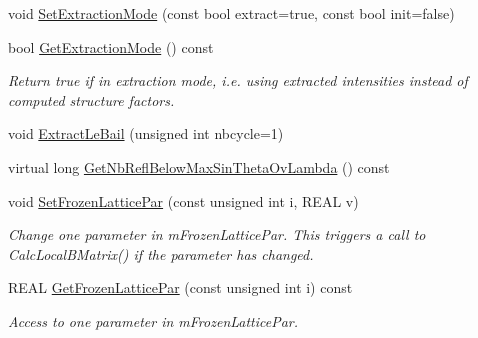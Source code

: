 \begin{DoxyCompactItemize}
\item 
void \mbox{\hyperlink{class_obj_cryst_1_1_powder_pattern_diffraction_a02f1293bc57c472a85741a328521d95f}{Set\+Extraction\+Mode}} (const bool extract=true, const bool init=false)
\item 
\mbox{\label{class_obj_cryst_1_1_powder_pattern_diffraction_a94113df4e6569ab17bb1f0c338af61db}} 
bool \mbox{\hyperlink{class_obj_cryst_1_1_powder_pattern_diffraction_a94113df4e6569ab17bb1f0c338af61db}{Get\+Extraction\+Mode}} () const
\begin{DoxyCompactList}\small\item\em Return true if in extraction mode, i.\+e. using extracted intensities instead of computed structure factors. \end{DoxyCompactList}\item 
void \mbox{\hyperlink{class_obj_cryst_1_1_powder_pattern_diffraction_aa86150b55c39275e7d076afb2b43513d}{Extract\+Le\+Bail}} (unsigned int nbcycle=1)
\item 
virtual long \mbox{\hyperlink{class_obj_cryst_1_1_powder_pattern_diffraction_a87785bf69fbd81df78c47f3d42efaf4e}{Get\+Nb\+Refl\+Below\+Max\+Sin\+Theta\+Ov\+Lambda}} () const
\item 
\mbox{\label{class_obj_cryst_1_1_powder_pattern_diffraction_a1442bfe8919fdb8ba03a1a6423a2d231}} 
void \mbox{\hyperlink{class_obj_cryst_1_1_powder_pattern_diffraction_a1442bfe8919fdb8ba03a1a6423a2d231}{Set\+Frozen\+Lattice\+Par}} (const unsigned int i, R\+E\+AL v)
\begin{DoxyCompactList}\small\item\em Change one parameter in m\+Frozen\+Lattice\+Par. This triggers a call to Calc\+Local\+B\+Matrix() if the parameter has changed. \end{DoxyCompactList}\item 
\mbox{\label{class_obj_cryst_1_1_powder_pattern_diffraction_a222fac3fc99e0b25618f6c4f3f55d301}} 
R\+E\+AL \mbox{\hyperlink{class_obj_cryst_1_1_powder_pattern_diffraction_a222fac3fc99e0b25618f6c4f3f55d301}{Get\+Frozen\+Lattice\+Par}} (const unsigned int i) const
\begin{DoxyCompactList}\small\item\em Access to one parameter in m\+Frozen\+Lattice\+Par. \end{DoxyCompactList}\item 

\end{DoxyCompactItemize}
